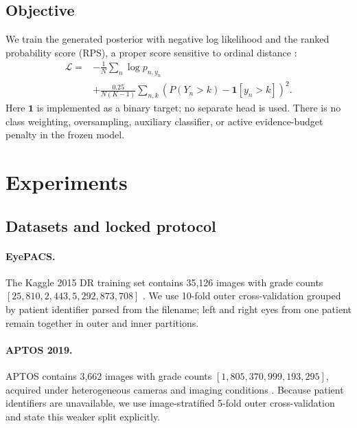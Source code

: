 \documentclass[10pt,twocolumn,letterpaper]{article}
\begin{document}
\subsection{Objective}

We train the generated posterior with negative log likelihood and the ranked
probability score (RPS), a proper score sensitive to ordinal distance
\cite{epstein1969rps,gneiting2007proper}:
\begin{equation}
\begin{aligned}
\mathcal L={}&-\frac1N\sum_n\log p_{n,y_n} \\
&+\frac{0.25}{N(K-1)}\sum_{n,k}
\left(P(Y_n>k)-\mathbf{1}[y_n>k]\right)^2.
\end{aligned}
\label{eq:loss}
\end{equation}
Here $\mathbf{1}$ is implemented as a binary target; no separate head is used.
There is no class weighting, oversampling, auxiliary classifier, or active
evidence-budget penalty in the frozen model.

\section{Experiments}
\label{sec:experiments}

\subsection{Datasets and locked protocol}

\paragraph{EyePACS.}
The Kaggle 2015 DR training set contains 35,126 images with grade counts
$[25{,}810, 2{,}443, 5{,}292, 873, 708]$ \cite{kaggle2015eyepacs}.  We use
10-fold outer cross-validation grouped by patient identifier parsed from the
filename; left and right eyes from one patient remain together in outer and
inner partitions.

\paragraph{APTOS 2019.}
APTOS contains 3,662 images with grade counts
$[1{,}805,370,999,193,295]$, acquired under heterogeneous cameras and imaging
conditions \cite{aptos2019}.  Because patient identifiers are unavailable, we
use image-stratified 5-fold outer cross-validation and state this weaker split
explicitly.
\end{document}
